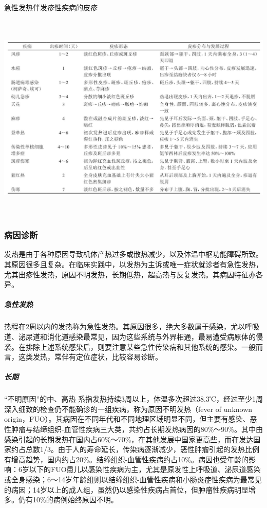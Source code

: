 \begin{table}[htbp]
\centering
\caption{急性发热伴发疹性疾病的皮疹}
\label{tab1-1}
\includegraphics[width=6.625in,height=3.95833in]{./images/Image00003.jpg}
\end{table}

\subsubsection{病因诊断}

发热是由于各种原因导致机体产热过多或散热减少，以及体温中枢功能障碍所致。其原因很多且复杂。在临床实践中，以发热为主诉或唯一症状就诊者有急性发热，尤其出疹性发热，原因不明发热，长期低热，超高热与反复发热。其病因特征亦各异。

\subparagraph{急性发热}

热程在2周以内的发热称为急性发热。其原因很多，绝大多数属于感染，尤以呼吸道、泌尿道和消化道感染最常见，因为这些系统与外界相通，最易遭受病原体的侵袭。在排除上述系统感染后，则要注意某些急性传染病和其他系统的感染。一般而言，这类发热，常伴有定位症状，比较容易诊断。

\subparagraph{长期}

“不明原因”的中、高热
系指发热持续3周以上，体温多次超过38.3℃，经过至少1周深入细致的检查仍不能确诊的一组疾病，称为原因不明发热（fever
of unknown
origin，FUO）。其病因在不同年代和不同地理区域明显不同，但主要有感染、恶性肿瘤与结缔组织-血管性疾病三大类，共约占长期发热病因的80\%～90\%。其中由感染引起的长期发热在国内占60\%～70\%，在其他发展中国家更高些，而在发达国家约占总数1/3。由于人的寿命延长，传染病逐渐减少，恶性肿瘤引起的发热比例有增高趋势，国内约占20\%。结缔组织-血管性疾病约占10\%。病因也受年龄的影响：6岁以下的FUO患儿以感染性疾病为主，尤其是原发性上呼吸道、泌尿道感染或全身感染；6～14岁年龄组则以结缔组织-血管性疾病和小肠炎症性疾病为最常见的病因；14岁以上的成人组，虽然仍以感染性疾病占首位，但肿瘤性疾病明显增多。仍有10\%的病例始终原因不明。

